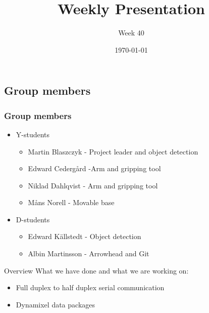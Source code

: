 \documentclass{beamer}
\title{Weekly Presentation}
\subtitle{Week 40}
\author{}
\institute{Luleå University of Technology}
\date{\today}
\begin{document}
\begin{frame}
    \titlepage
\end{frame}




\begin{frame}
    \subsection{Group members}
    \frametitle{Group members }
    \begin{itemize}
        \item Y-students
        \begin{itemize}
            \item Martin Blaszczyk - Project leader and object detection
            \item Edward Cedergård -Arm and gripping tool
            \item Niklad Dahlqvist -  Arm and gripping tool
            \item Måns Norell - Movable base
        \end{itemize}
        \item D-students
        \begin{itemize}
            \item Edward Källstedt - Object detection
            \item Albin Martinsson - Arrowhead and Git
        \end{itemize}  
    \end{itemize}
\end{frame}




\begin{frame}{Overview}
What we have done and what we are working on:
    \begin{itemize}
        \item Full duplex to half duplex serial communication
        \item Dynamixel data packages
    \end{itemize}
\end{frame}







\end{document}
